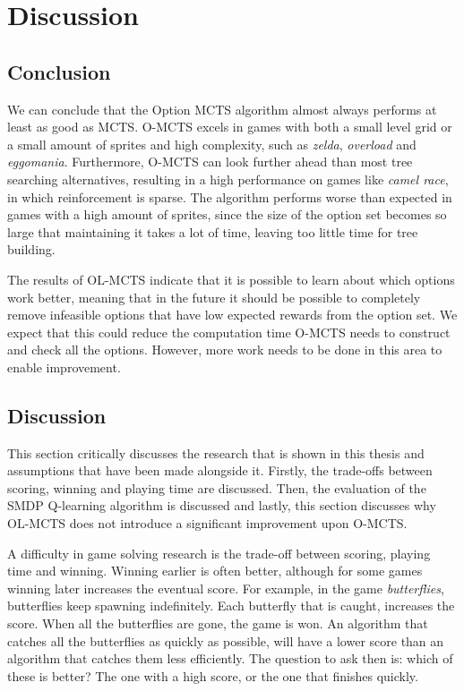 \chapter{Discussion}
\label{sec:conclusion}



\section{Conclusion}
We can conclude that the Option MCTS algorithm almost always performs at least
as good as MCTS. O-MCTS excels in games with both a small level grid or a small
amount of sprites and high complexity, such as \textit{zelda},
\textit{overload} and \textit{eggomania}.  Furthermore, O-MCTS can look further
ahead than most tree searching alternatives, resulting in a high performance
on games like \textit{camel race}, in which reinforcement is sparse. The
algorithm performs worse than expected in games with a high amount of sprites,
since the size of the option set becomes so large that maintaining it takes a
lot of time, leaving too little time for tree building.

The results of OL-MCTS indicate that it is possible to learn about which options
work better, meaning that in the future it should be possible to completely
remove infeasible options that have low expected rewards from the option set. We
expect that this could reduce the computation time O-MCTS needs to construct and
check all the options. However, more work needs to be done in this area to
enable improvement.

\section{Discussion}
This section critically discusses the research that is shown in this thesis and
assumptions that have been made alongside it. Firstly, the trade-offs between
scoring, winning and playing time are discussed. Then, the evaluation of the
SMDP Q-learning algorithm is discussed and lastly, this section discusses why
OL-MCTS does not introduce a significant improvement upon O-MCTS.

A difficulty in game solving research is the trade-off between scoring, playing
time and winning. Winning earlier is often better, although for some games
winning later increases the eventual score. For example, in the game
\textit{butterflies}, butterflies keep spawning indefinitely. Each butterfly
that is caught, increases the score.  When all the butterflies are gone, the
game is won. An algorithm that catches all the butterflies as quickly as
possible, will have a lower score than an algorithm that catches them less
efficiently. The question to ask then is: which of these is better? The one with
a high score, or the one that finishes quickly.

